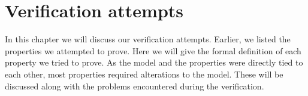 \section{Verification attempts}
In this chapter we will discuss our verification attempts. Earlier, we listed the properties we attempted to prove. Here we will give the formal definition of each property we tried to prove. As the model and the properties were directly tied to each other, most properties required alterations to the model. These will be discussed along with the problems encountered during the verification.



